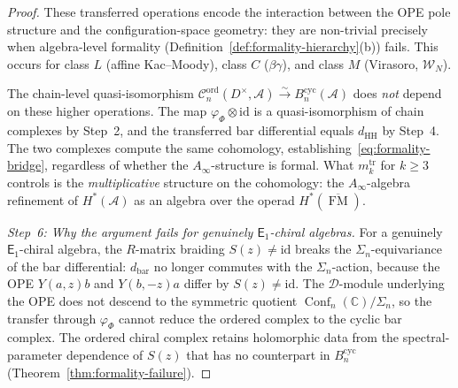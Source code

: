 \documentclass[11pt,reqno]{amsart}
\theoremstyle{definition}
\theoremstyle{remark}
\newcommand{\cA}{\mathcal{A}}
\newcommand{\cC}{\mathcal{C}}
\newcommand{\cD}{\mathcal{D}}
\newcommand{\cW}{\mathcal{W}}
\newcommand{\HH}{\mathrm{HH}}
\newcommand{\Ainf}{A_{\infty}}
\newcommand{\Eone}{\mathsf{E}_{1}}
\DeclareMathOperator{\Conf}{Conf}
\DeclareMathOperator{\FM}{FM}
\newcommand{\CC}{\mathbb{C}}
\newcommand{\id}{\mathrm{id}}
\numberwithin{equation}{section}
\begin{document}
\begin{proof}
These transferred operations encode the interaction
between the OPE pole structure and the
configuration-space geometry: they are non-trivial
precisely when algebra-level formality
\textup{(}Definition~\ref{def:formality-hierarchy}(b)\textup{)}
fails. This occurs for class $L$
\textup{(}affine Kac--Moody\textup{)}, class $C$
\textup{(}$\beta\gamma$\textup{)}, and class $M$
\textup{(}Virasoro, $\cW_N$\textup{)}.

The chain-level quasi-isomorphism
$\cC_n^{\mathrm{ord}}(D^\times, \cA)
\xrightarrow{\sim} B^{\mathrm{cyc}}_n(\cA)$
does \emph{not} depend on these higher operations.
The map $\varphi_\Phi \otimes \id$ is a
quasi-isomorphism of chain complexes by Step~2,
and the transferred bar differential equals $d_{\HH}$
by Step~4. The two complexes compute the same
cohomology, establishing~\eqref{eq:formality-bridge},
regardless of whether the $\Ainf$-structure is formal.
What $m_k^{\mathrm{tr}}$ for $k \geq 3$ controls is the
\emph{multiplicative} structure on the cohomology:
the $\Ainf$-algebra refinement of $H^*(\cA)$ as an
algebra over the operad $H^*(\overline{\FM})$.

\medskip
\noindent\textit{Step~6: Why the argument fails for
genuinely $\Eone$-chiral algebras.}
For a genuinely $\Eone$-chiral algebra, the $R$-matrix
braiding $S(z) \neq \id$ breaks the
$\Sigma_n$-equivariance of the bar differential:
$d_{\mathrm{bar}}$ no longer commutes with the
$\Sigma_n$-action, because the OPE $Y(a,z)b$ and
$Y(b,-z)a$ differ by $S(z) \neq \id$. The $\cD$-module
underlying the OPE does not descend to the symmetric
quotient $\Conf_n(\CC)/\Sigma_n$, so the transfer
through $\varphi_\Phi$ cannot reduce the ordered complex
to the cyclic bar complex. The ordered chiral complex
retains holomorphic data from the spectral-parameter
dependence of $S(z)$ that has no counterpart in
$B^{\mathrm{cyc}}_n$
\textup{(}Theorem~\textup{\ref{thm:formality-failure}}\textup{)}.
\end{proof}
\end{document}
